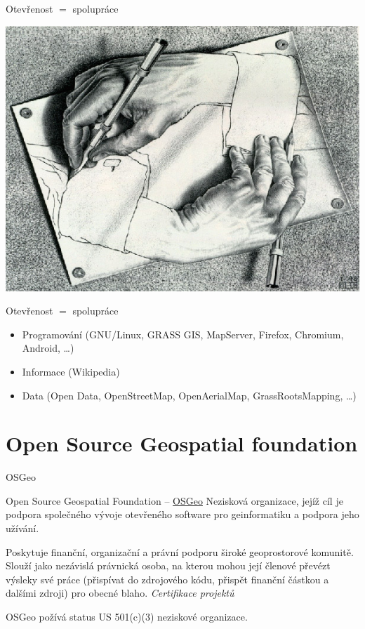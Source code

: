 \documentclass[xcolor=dvipsnames]{beamer}
\begin{document}
\begin{frame}{Otevřenost $=$ spolupráce}
        \begin{center}
            \includegraphics[width=\textheight]{imgs/ils/escher.jpg}
        \end{center}
\end{frame}

\begin{frame}{Otevřenost $=$ spolupráce}
    \begin{itemize}
        \item Programování (GNU/Linux, GRASS GIS, MapServer, Firefox, Chromium,
        Android, \dots)
            \pause
        \item Informace (Wikipedia)
            \pause
        \item Data (Open Data, OpenStreetMap, OpenAerialMap, GrassRootsMapping,
        \dots)
    \end{itemize}
\end{frame}

\section{Open Source Geospatial foundation}

\begin{frame}{OSGeo}
\begin{block}{Open Source Geospatial Foundation -- \href{http://osgeo.org}{OSGeo}}
Nezisková organizace, jejíž cíl je podpora společného vývoje otevřeného software
pro geinformatiku a podpora jeho užívání. 

Poskytuje finanční, organizační a právní podporu široké geoprostorové komunitě.
Slouží jako nezávislá právnická osoba, na kterou mohou její členové převézt
výsleky své práce (přispívat do zdrojového kódu, přispět finanční částkou a
dalšími zdroji) pro obecné blaho. {\em Certifikace projektů}

OSGeo požívá status US 501(c)(3) neziskové organizace.
\end{block}
\end{frame}
\end{document}
